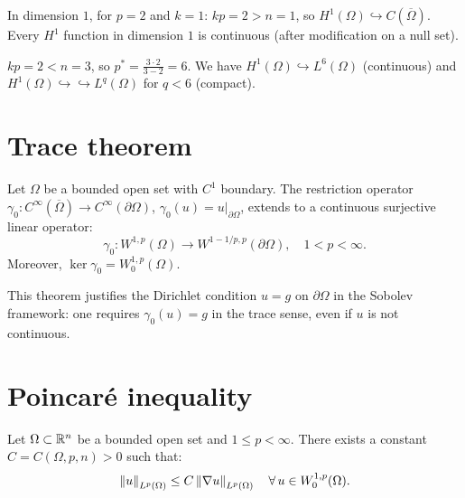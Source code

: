 \begin{example}[Case $n = 1$]
In dimension $1$, for $p = 2$ and $k = 1$: $kp = 2 > n = 1$, so
$H^1(\Omega) \hookrightarrow C(\overline{\Omega})$. Every $H^1$ function in
dimension $1$ is continuous (after modification on a null set).
\end{example}

\begin{example}[Case $n = 3$, $k = 1$, $p = 2$]
$kp = 2 < n = 3$, so $p^* = \frac{3 \cdot 2}{3 - 2} = 6$.
We have $H^1(\Omega) \hookrightarrow L^6(\Omega)$ (continuous) and
$H^1(\Omega) \hookrightarrow\hookrightarrow L^q(\Omega)$ for $q < 6$ (compact).
\end{example}

\section{Trace theorem}

\begin{theorem}[Trace]
\label{thm:trace}
Let $\Omega$ be a bounded open set with $C^1$ boundary. The restriction operator
$\gamma_0 : C^\infty(\overline{\Omega}) \to C^\infty(\partial\Omega)$,
$\gamma_0(u) = u|_{\partial\Omega}$, extends to a continuous surjective linear
operator:
\[
    \gamma_0 : W^{1,p}(\Omega) \to W^{1-1/p, p}(\partial\Omega),
    \quad 1 < p < \infty.
\]
Moreover, $\ker \gamma_0 = W_0^{1,p}(\Omega)$.
\end{theorem}

\begin{remark}
This theorem justifies the Dirichlet condition $u = g$ on $\partial\Omega$ in the
Sobolev framework: one requires $\gamma_0(u) = g$ in the trace sense, even if $u$
is not continuous.
\end{remark}

\section{Poincar\'e inequality}

\begin{theorem}
\label{thm:poincare}
Let $\Omega \subset \mathbb{R}^n$ be a bounded open set and $1 \leq p < \infty$. There
exists a constant $C = C(\Omega, p, n) > 0$ such that:
\[
    \left\| u \right\|_{L^p(\Omega)} \leq C \left\| \nabla u \right\|_{L^p(\Omega)}
    \quad \forall\, u \in W_0^{1,p}(\Omega).
\]
\end{theorem}

